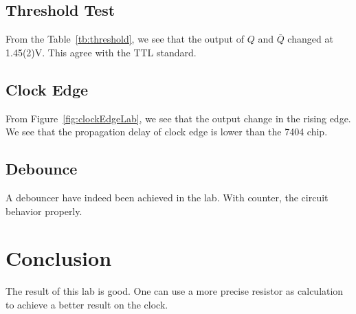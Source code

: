 \documentclass[aps,prl,reprint]{revtex4-1}
\begin{document}
    \subsection{Threshold Test}
        From the Table~\ref{tb:threshold}, we see that the output of $Q$ and $\bar Q$ changed at 1.45(2)V. This agree with the TTL standard.
    \subsection{Clock Edge}
        From Figure~\ref{fig:clockEdgeLab}, we see that the output change in the rising edge. We see that the propagation delay of clock edge is lower than the 7404 chip.
    \subsection{Debounce}
        A debouncer have indeed been achieved in the lab. With counter, the circuit behavior properly.

\section{Conclusion}
    The result of this lab is good. One can use a more precise resistor as calculation to achieve a better result on the clock.







\end{document}
